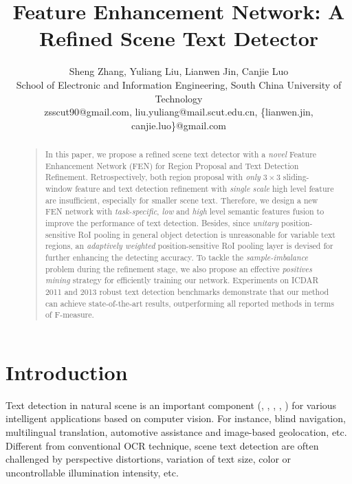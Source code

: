\documentclass[letterpaper]{article}
\begin{document}
%
\title{Feature Enhancement Network: A Refined Scene Text Detector}
\author{Sheng Zhang, Yuliang Liu, Lianwen Jin, Canjie Luo\\
School of Electronic and Information Engineering, South China University of Technology\\
zsscut90@gmail.com, liu.yuliang@mail.scut.edu.cn, \{lianwen.jin, canjie.luo\}@gmail.com\\
}
\maketitle
\begin{abstract}
\begin{quote}
In this paper, we propose a refined scene text detector with a \textit{novel} Feature Enhancement Network (FEN) for Region Proposal and Text Detection Refinement. Retrospectively, both region proposal with \textit{only} $3\times 3$ sliding-window feature and text detection refinement with \textit{single scale} high level feature are insufficient, especially for smaller scene text. Therefore, we design a new FEN network with \textit{task-specific}, \textit{low} and \textit{high} level semantic features fusion to improve the performance of text detection. Besides, since \textit{unitary} position-sensitive RoI pooling in general object detection is unreasonable for variable text regions, an \textit{adaptively weighted} position-sensitive RoI pooling layer is devised for further enhancing the detecting accuracy. To tackle the \textit{sample-imbalance} problem during the refinement stage, we also propose an effective \textit{positives mining} strategy for efficiently training our network. Experiments on ICDAR 2011 and 2013 robust text detection benchmarks demonstrate that our method can achieve state-of-the-art results, outperforming all reported methods in terms of F-measure.
\end{quote}
\end{abstract}

\section{Introduction}
Text detection in natural scene is an important component (\cite{bissacco2013photoocr}, \cite{yin2014robust}, \cite{ye2015text}, \cite{He2016Text}, \cite{he2017single}) for various intelligent applications based on computer vision. For instance, blind navigation, multilingual translation, automotive assistance and image-based geolocation, etc. Different from conventional OCR technique, scene text detection are often challenged by perspective distortions, variation of text size, color or uncontrollable illumination intensity, etc.
\end{document}
